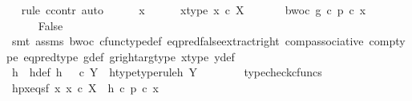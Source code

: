 \begin{isabellebody}
\ \ \isamarkupfalse%
{\isacharparenleft}{\kern0pt}rule\ ccontr{\isacharcomma}{\kern0pt}\ auto{\isacharparenright}{\kern0pt}\isanewline
\ \ \ \ \isamarkupfalse%
\ x\isanewline
\ \ \ \ \isamarkupfalse%
\ x{\isacharunderscore}{\kern0pt}type{\isacharcolon}{\kern0pt}\ {\isachardoublequoteopen}x\ {\isasymin}\isactrlsub c\ X{\isachardoublequoteclose}\ \isanewline
\ \ \ \ \isamarkupfalse%
\ bwoc{\isacharcolon}{\kern0pt}\ {\isachardoublequoteopen}g\ {\isasymcirc}\isactrlsub c\ p\ {\isasymcirc}\isactrlsub c\ x\ {\isasymnoteq}\ {\isasymf}{\isachardoublequoteclose}\isanewline
\ \ \ \isanewline
\ \ \ \ \isamarkupfalse%
\ False\ \ \isanewline
\ \ \ \ \ \ \isamarkupfalse%
\ {\isacharparenleft}{\kern0pt}smt\ assms{\isacharparenleft}{\kern0pt}{}{\isacharparenright}{\kern0pt}\ bwoc\ cfunc{\isacharunderscore}{\kern0pt}type{\isacharunderscore}{\kern0pt}def\ eq{\isacharunderscore}{\kern0pt}pred{\isacharunderscore}{\kern0pt}false{\isacharunderscore}{\kern0pt}extract{\isacharunderscore}{\kern0pt}right\ comp{\isacharunderscore}{\kern0pt}associative\ comp{\isacharunderscore}{\kern0pt}type\ eq{\isacharunderscore}{\kern0pt}pred{\isacharunderscore}{\kern0pt}type\ g{\isacharunderscore}{\kern0pt}def\ g{\isacharunderscore}{\kern0pt}right{\isacharunderscore}{\kern0pt}arg{\isacharunderscore}{\kern0pt}type\ x{\isacharunderscore}{\kern0pt}type\ y{\isacharunderscore}{\kern0pt}def{\isacharparenright}{\kern0pt}\isanewline
\ \ \isamarkupfalse%
\isanewline
\ \ \isamarkupfalse%
\ h\ \ h{\isacharunderscore}{\kern0pt}def{\isacharcolon}{\kern0pt}\ {\isachardoublequoteopen}h\ {\isacharequal}{\kern0pt}\ {\isasymf}\ {\isasymcirc}\isactrlsub c\ {\isasymbeta}\isactrlbsub Y\isactrlesub {\isachardoublequoteclose}\ \ h{\isacharunderscore}{\kern0pt}type{\isacharbrackleft}{\kern0pt}type{\isacharunderscore}{\kern0pt}rule{\isacharbrackright}{\kern0pt}{\isacharcolon}{\kern0pt}{\isachardoublequoteopen}h{\isacharcolon}{\kern0pt}\ Y\ {\isasymrightarrow}\ {\isasymOmega}{\isachardoublequoteclose}\isanewline
\ \ \ \ \isamarkupfalse%
\ typecheck{\isacharunderscore}{\kern0pt}cfuncs\isanewline
\ \ \isamarkupfalse%
\ hpx{\isacharunderscore}{\kern0pt}eqs{\isacharunderscore}{\kern0pt}f{\isacharcolon}{\kern0pt}\ {\isachardoublequoteopen}{\isasymforall}x{\isachardot}{\kern0pt}\ x\ {\isasymin}\isactrlsub c\ X\ {\isasymlongrightarrow}\ h\ {\isasymcirc}\isactrlsub c\ p\ {\isasymcirc}\isactrlsub c\ x\ {\isacharequal}{\kern0pt}\ {\isasymf}{\isachardoublequoteclose}\isanewline

\end{isabellebody}
